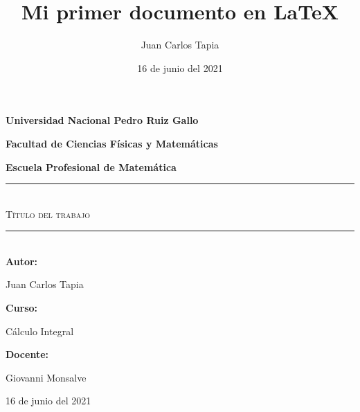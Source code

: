 \documentclass{article}
\title{Mi primer documento en \LaTeX}
\author{Juan Carlos Tapia}
\date{16 de junio del 2021}
\begin{document}
\begin{titlepage}
\begin{center}
{\bf \LARGE  Universidad Nacional Pedro Ruiz Gallo}\par
\vspace{2mm}
{\bf \Large Facultad de Ciencias Físicas y Matemáticas}\par
\vspace{2mm}
{\bf \large Escuela Profesional de Matemática}\par
\vspace{1cm}
\vspace{1cm}
{\rule{\linewidth}{0.50mm}}\\
\vspace{3mm}
{\scshape \huge Título del trabajo}\\
\vspace{3mm}
{\rule{\linewidth}{0.50mm}}\\
\vspace{1cm}
{\bf \Large Autor:}\par
\vspace{2mm}
{\Large Juan Carlos Tapia}\par
\vspace{1cm}
{\bf \Large Curso:}\par
\vspace{2mm}
{\Large Cálculo Integral}\par
\vspace{1cm}
{\bf \Large Docente:}\par
\vspace{2mm}
{\Large Giovanni Monsalve}\par
\vspace{1cm}
{\Large 16 de junio del 2021}
\end{center}
\end{titlepage}
\end{document}
